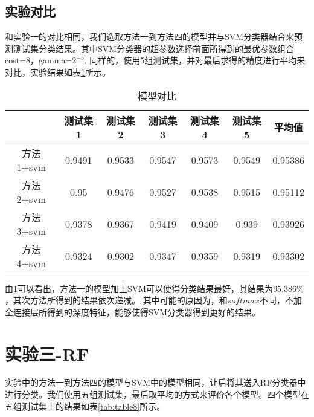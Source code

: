 \documentclass[lang=cn,11pt,a4paper,cite=authoryear]{elegantpaper}
\begin{document}
\subsection{实验对比}
和实验一的对比相同，我们选取方法一到方法四的模型并与SVM分类器结合来预测测试集分类结果。其中SVM分类器的超参数选择前面所得到的最优参数组合cost=8，gamma=$2^{-5}$.
同样的，使用5组测试集，并对最后求得的精度进行平均来对比，实验结果如表\ref{tab:table7}所示。


\begin{table}[htbp]
  \centering
  \caption{模型对比}
    \begin{tabular}{|c|c|c|c|c|c|c|}
    \toprule
          & 测试集1  & 测试集2  & 测试集3  & 测试集4  & 测试集5  & 平均值 \\
    \midrule
    方法1+svm & 0.9491 & 0.9533 & 0.9547 & 0.9573 & 0.9549 & \cellcolor[rgb]{ .753,  0,  0}0.95386 \\
    \midrule
    方法2+svm & 0.95  & 0.9476 & 0.9527 & 0.9538 & 0.9515 & \cellcolor[rgb]{ 1,  0,  0}0.95112 \\
    \midrule
    方法3+svm & 0.9378 & 0.9367 & 0.9419 & 0.9409 & 0.939 & \cellcolor[rgb]{ 1,  .486,  .502}0.93926 \\
    \midrule
    方法4+svm & 0.9324 & 0.9302 & 0.9347 & 0.9359 & 0.9319 & \cellcolor[rgb]{ 1,  .8,  .8}0.93302 \\
    \bottomrule
    \end{tabular}%
  \label{tab:table7}%
\end{table}%

由\ref{tab:table7}可以看出，方法一的模型加上SVM可以使得分类结果最好，其结果为$95.386\%$，其次方法所得到的结果依次递减。
其中可能的原因为，和$softmax$不同，不加全连接层所得到的深度特征，能够使得SVM分类器得到更好的结果。

\section{实验三-RF}
实验中的方法一到方法四的模型与SVM中的模型相同，让后将其送入RF分类器中进行分类。我们使用五组测试集，最后取平均的方式来评价各个模型。四个模型在五组测试集上的结果如表\ref{tab:table8}所示。
\end{document}
